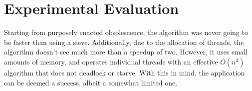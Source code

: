 \documentclass[12pt]{article}
\begin{document}
\section{Experimental Evaluation} 
Starting from purposely enacted obsolescence, the algorithm was never going to be faster than using a sieve.  Additionally, due to the allocation of threads, the algorithm doesn't see much more than a speedup of two. However, it uses small amounts of memory, and operates individual threads with an effective $O(n^2)$ algorithm that does not deadlock or starve. With this in mind, the application can be deemed a success, albeit a somewhat limited one.  
\end{document}
